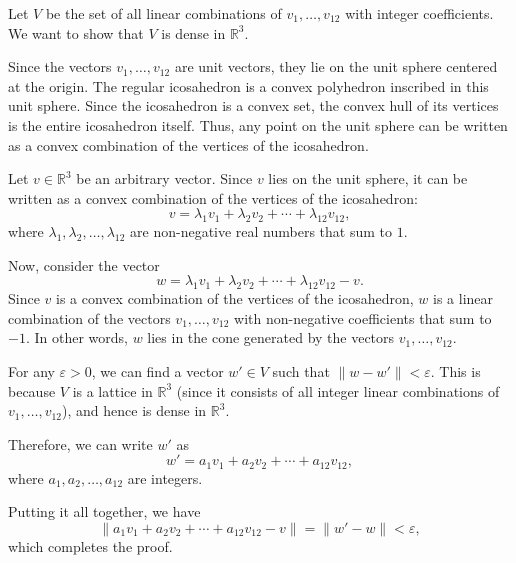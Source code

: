 Let $V$ be the set of all linear combinations of $v_1, \dots, v_{12}$ with integer coefficients. We want to show that $V$ is dense in $\mathbb{R}^3$. 

Since the vectors $v_1, \dots, v_{12}$ are unit vectors, they lie on the unit sphere centered at the origin. The regular icosahedron is a convex polyhedron inscribed in this unit sphere. Since the icosahedron is a convex set, the convex hull of its vertices is the entire icosahedron itself. Thus, any point on the unit sphere can be written as a convex combination of the vertices of the icosahedron.

Let $v \in \mathbb{R}^3$ be an arbitrary vector. Since $v$ lies on the unit sphere, it can be written as a convex combination of the vertices of the icosahedron:
\[
v = \lambda_1 v_1 + \lambda_2 v_2 + \cdots + \lambda_{12} v_{12},
\]
where $\lambda_1, \lambda_2, \dots, \lambda_{12}$ are non-negative real numbers that sum to $1$. 

Now, consider the vector
\[
w = \lambda_1 v_1 + \lambda_2 v_2 + \cdots + \lambda_{12} v_{12} - v.
\]
Since $v$ is a convex combination of the vertices of the icosahedron, $w$ is a linear combination of the vectors $v_1, \dots, v_{12}$ with non-negative coefficients that sum to $-1$. In other words, $w$ lies in the cone generated by the vectors $v_1, \dots, v_{12}$.

For any $\varepsilon > 0$, we can find a vector $w' \in V$ such that $\|w - w'\| < \varepsilon$. This is because $V$ is a lattice in $\mathbb{R}^3$ (since it consists of all integer linear combinations of $v_1, \dots, v_{12}$), and hence is dense in $\mathbb{R}^3$. 

Therefore, we can write $w'$ as
\[
w' = a_1 v_1 + a_2 v_2 + \cdots + a_{12} v_{12},
\]
where $a_1, a_2, \dots, a_{12}$ are integers. 

Putting it all together, we have
\[
\| a_1 v_1 + a_2 v_2 + \cdots + a_{12} v_{12} - v \| = \| w' - w \| < \varepsilon,
\]
which completes the proof.
